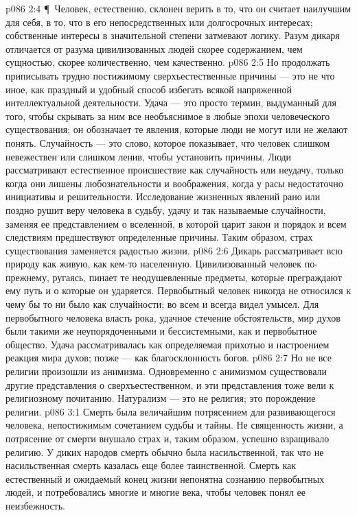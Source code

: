 \vs p086 2:4 \P\ Человек, естественно, склонен верить в то, что он считает наилучшим для себя, в то, что в его непосредственных или долгосрочных интересах; собственные интересы в значительной степени затмевают логику. Разум дикаря отличается от разума цивилизованных людей скорее содержанием, чем сущностью, скорее количественно, чем качественно.
\vs p086 2:5 Но продолжать приписывать трудно постижимому сверхъестественные причины --- это не что иное, как праздный и удобный способ избегать всякой напряженной интеллектуальной деятельности. Удача --- это просто термин, выдуманный для того, чтобы скрывать за ним все необъяснимое в любые эпохи человеческого существования; он обозначает те явления, которые люди не могут или не желают понять. Случайность --- это слово, которое показывает, что человек слишком невежествен или слишком ленив, чтобы установить причины. Люди рассматривают естественное происшествие как случайность или неудачу, только когда они лишены любознательности и воображения, когда у расы недостаточно инициативы и решительности. Исследование жизненных явлений рано или поздно рушит веру человека в судьбу, удачу и так называемые случайности, заменяя ее представлением о вселенной, в которой царит закон и порядок и всем следствиям предшествуют определенные причины. Таким образом, страх существования заменяется радостью жизни.
\vs p086 2:6 Дикарь рассматривает всю природу как живую, как кем\hyp{}то населенную. Цивилизованный человек по\hyp{}прежнему, ругаясь, пинает те неодушевленные предметы, которые преграждают ему путь и о которые он ударяется. Первобытный человек никогда не относился к чему бы то ни было как случайности; во всем и всегда видел умысел. Для первобытного человека власть рока, удачное стечение обстоятельств, мир духов были такими же неупорядоченными и бессистемными, как и первобытное общество. Удача рассматривалась как определяемая прихотью и настроением реакция мира духов; позже --- как благосклонность богов.
\vs p086 2:7 Но не все религии произошли из анимизма. Одновременно с анимизмом существовали другие представления о сверхъестественном, и эти представления тоже вели к религиозному почитанию. Натурализм --- это не религия; это порождение религии.
\vs p086 3:1 Смерть была величайшим потрясением для развивающегося человека, непостижимым сочетанием судьбы и тайны. Не священность жизни, а потрясение от смерти внушало страх и, таким образом, успешно взращивало религию. У диких народов смерть обычно была насильственной, так что не насильственная смерть казалась еще более таинственной. Смерть как естественный и ожидаемый конец жизни непонятна сознанию первобытных людей, и потребовались многие и многие века, чтобы человек понял ее неизбежность.
